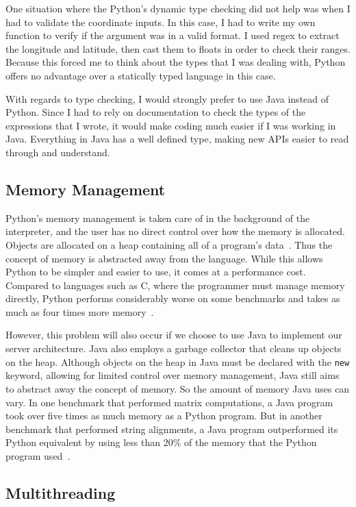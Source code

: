 \documentclass[letterpaper,twocolumn,10pt]{article}
\begin{document}
One situation where the Python's dynamic type checking did not help was when I had to validate the coordinate inputs. In this case,
I had to write my own function to verify if the argument was in a valid format. I used regex to extract the longitude and latitude, then
cast them to floats in order to check their ranges. Because this forced me to think about the types that I was dealing with, Python
offers no advantage over a statically typed language in this case.

With regards to type checking, I would strongly prefer to use Java instead of Python. Since I had to rely on documentation to check the types
of the expressions that I wrote, it would make coding much easier if I was working in Java. Everything in Java has a well defined type, making
new APIs easier to read through and understand.

\subsection{Memory Management}

Python's memory management is taken care of in the background of the interpreter, and the user has no direct control over how the memory is
allocated. Objects are allocated on a heap containing all of a program's data~\cite{memorydocs}. Thus the concept of memory is abstracted away from
the language. While this allows Python to be simpler and easier to use, it comes at a performance cost. Compared to languages such as C, where
the programmer must manage memory directly, Python performs considerably worse on some benchmarks and takes as much as four times more
memory~\cite{fourment2008}.

However, this problem will also occur if we choose to use Java to implement our server architecture. Java also employs a garbage collector
that cleans up objects on the heap. Although objects on the heap in Java must be declared with the \texttt{new} keyword, allowing for limited
control over memory management, Java still aims to abstract away the concept of memory. So the amount of memory Java uses can vary. In one benchmark
that performed matrix computations, a Java program took over five times as much memory as a Python program. But in another benchmark that
performed string alignments, a Java program outperformed its Python equivalent by using less than 20\% of the memory that the Python program
used~\cite{fourment2008}.

\subsection{Multithreading}
\end{document}
